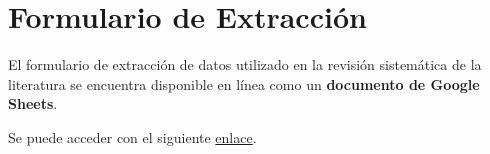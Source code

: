 \appendix

\section{Formulario de Extracción}
\label{sec:extraction_form}

El formulario de extracción de datos utilizado en la revisión sistemática de la literatura se encuentra disponible en línea
como un \textbf{documento de Google Sheets}.

Se puede acceder con el siguiente \href{https://docs.google.com}{enlace}.
